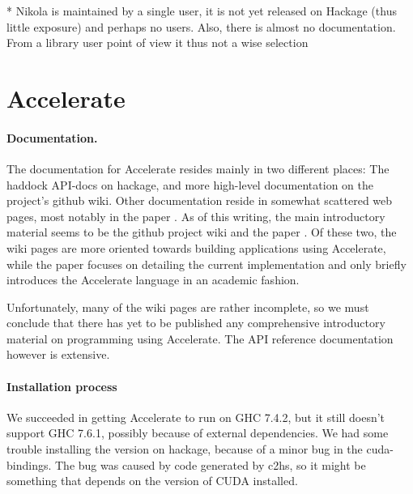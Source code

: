   * Nikola is maintained by a single user, it is not yet released on
    Hackage (thus little exposure) and perhaps no users. Also, there
    is almost no documentation. From a library user point of view it
    thus not a wise selection





\section{Accelerate}
\paragraph{Documentation.} The documentation for Accelerate resides mainly in
two different places: The haddock API-docs on hackage, and more high-level
documentation on the project's github wiki.  Other documentation reside in
somewhat scattered web pages, most notably in the paper
\cite{chakravarty2011accelerating}.  As of this writing, the main introductory
material seems to be the github project wiki and the paper
\cite{chakravarty2011accelerating}. Of these two, the wiki pages are more
oriented towards building applications using Accelerate, while the paper
focuses on detailing the current implementation and only briefly introduces the
Accelerate language in an academic fashion.

Unfortunately, many of the wiki pages are rather incomplete, so we must
conclude that there has yet to be published any comprehensive introductory
material on programming using Accelerate.
The API reference documentation however is extensive.

\paragraph{Installation process} We succeeded in getting Accelerate to run on
GHC 7.4.2, but it still doesn't support GHC 7.6.1, possibly because of external
dependencies.  We had some trouble installing the version on hackage, because
of a minor bug in the cuda-bindings. The bug was caused by code generated by
c2hs, so it might be something that depends on the version of CUDA installed.

